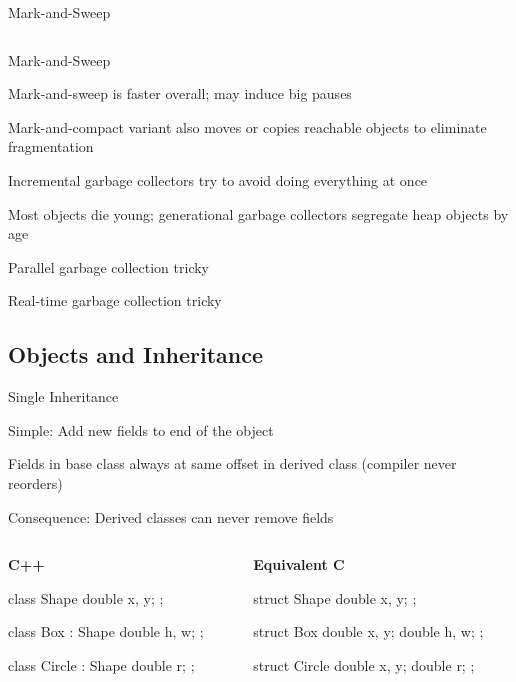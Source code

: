 \documentclass{plt}
\begin{document}
\begin{frame}[fragile,t]{Mark-and-Sweep}
\begin{columns}[t]
\begin{column}{0.6\textwidth}
\end{column}
\end{columns}

\end{frame}

\begin{frame}{Mark-and-Sweep}
\baselineskip

Mark-and-sweep is faster overall; may induce big pauses

Mark-and-compact variant also moves or copies reachable objects to
eliminate fragmentation

Incremental garbage collectors try to avoid doing everything at once

Most objects die young; generational garbage collectors segregate heap
objects by age

Parallel garbage collection tricky

Real-time garbage collection tricky

\end{frame}

\subsection{Objects and Inheritance}

\begin{frame}[fragile]{Single Inheritance}

Simple: Add new fields to end of the object

Fields in base class always at same offset in derived class (compiler
never reorders)

Consequence: Derived classes can never remove fields

\baselineskip

\begin{columns}
\begin{column}[t]{0.5\textwidth}
\textbf{C++}

\begin{cpp}
class Shape {
  double x, y;
};

class Box : Shape {
  double h, w;
};


class Circle : Shape {
  double r;
};

\end{cpp}
\end{column}
\begin{column}[t]{0.5\textwidth}
\textbf{Equivalent C}

\begin{C}
struct Shape {
  double x, y;
};

struct Box {
  double x, y;
  double h, w;
};

struct Circle {
  double x, y;
  double r;
};
\end{C}
\end{column}
\end{columns}
\end{frame}
\end{document}
